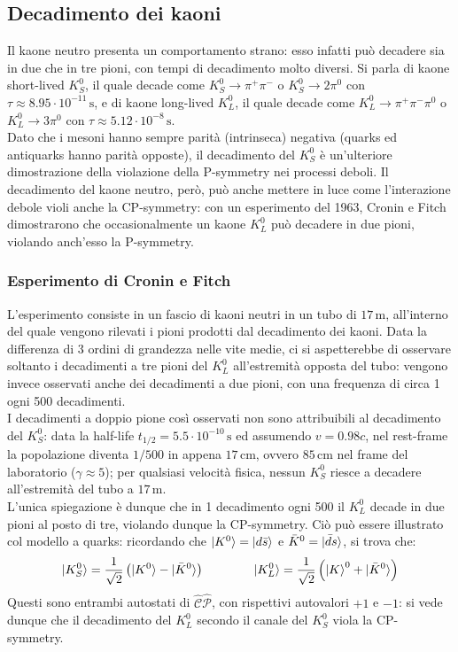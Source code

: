 \subsection{Decadimento dei kaoni}

Il kaone neutro presenta un comportamento strano: esso infatti può decadere sia in due che in tre pioni, con tempi di decadimento molto diversi. Si parla di kaone short-lived $ K^0_S $, il quale decade come $ K^0_S \rightarrow \pi^+ \pi^- $ o $ K^0_S \rightarrow 2\pi^0 $ con $ \tau \approx 8.95\cdot10^{-11}\,\text{s} $, e di kaone long-lived $ K^0_L $, il quale decade come $ K^0_L \rightarrow \pi^+ \pi^- \pi^0 $ o $ K^0_L \rightarrow 3\pi^0 $ con $ \tau \approx 5.12\cdot10^{-8}\,\text{s} $.\\
Dato che i mesoni hanno sempre parità (intrinseca) negativa (quarks ed antiquarks hanno parità opposte), il decadimento del $ K^0_S $ è un'ulteriore dimostrazione della violazione della P-symmetry nei processi deboli.
Il decadimento del kaone neutro, però, può anche mettere in luce come l'interazione debole violi anche la CP-symmetry: con un esperimento del 1963, Cronin e Fitch dimostrarono che occasionalmente un kaone $ K^0_L $ può decadere in due pioni, violando anch'esso la P-symmetry.

\subsubsection{Esperimento di Cronin e Fitch}

L'esperimento consiste in un fascio di kaoni neutri in un tubo di $ 17\,\text{m} $, all'interno del quale vengono rilevati i pioni prodotti dal decadimento dei kaoni. Data la differenza di 3 ordini di grandezza nelle vite medie, ci si aspetterebbe di osservare soltanto i decadimenti a tre pioni del $ K^0_L $ all'estremità opposta del tubo: vengono invece osservati anche dei decadimenti a due pioni, con una frequenza di circa 1 ogni 500 decadimenti.\\
I decadimenti a doppio pione così osservati non sono attribuibili al decadimento del $ K^0_S $: data la half-life $ t_{1/2} = 5.5\cdot10^{-10}\,\text{s} $ ed assumendo $ v = 0.98c $, nel rest-frame la popolazione diventa $ 1/500 $ in appena $ 17\,\text{cm} $, ovvero $ 85\,\text{cm} $ nel frame del laboratorio ($ \gamma \approx 5 $); per qualsiasi velocità fisica, nessun $ K^0_S $ riesce a decadere all'estremità del tubo a $ 17\,\text{m} $.\\
L'unica spiegazione è dunque che in 1 decadimento ogni 500 il $ K^0_L $ decade in due pioni al posto di tre, violando dunque la CP-symmetry. Ciò può essere illustrato col modello a quarks: ricordando che $ \ket{K^0} = \ket{d\bar{s}} $ e $ \bar{K}^0 = \ket{\bar{d}s} $, si trova che:
\begin{equation*}
	\ket{K^0_S} = \frac{1}{\sqrt{2}} \left( \ket{K^0} - \ket{\bar{K}^0} \right)
	\qquad \qquad
	\ket{K^0_L} = \frac{1}{\sqrt{2}} \left( \ket{K}^0 + \ket{\bar{K}^0} \right)
\end{equation*}
Questi sono entrambi autostati di $ \hat{\mathcal{C}}\hat{\mathcal{P}} $, con rispettivi autovalori $ +1 $ e $ -1 $: si vede dunque che il decadimento del $ K^0_L $ secondo il canale del $ K^0_S $ viola la CP-symmetry.

